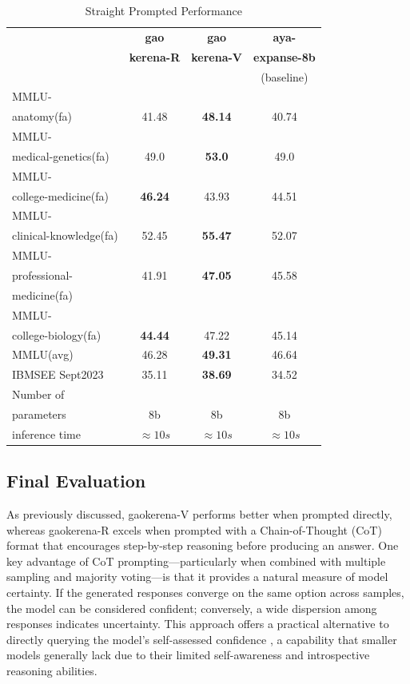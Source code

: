 \documentclass[conference]{IEEEtran}
\begin{document}
	\begin{table}[ht]
		\centering
		\caption{Straight Prompted Performance}
		\begin{tabular}{|l|c|c|c|}  
			\hline
			\textbf{} & \textbf{gao} & \textbf{gao} & \textbf{aya-} \\ 
			& \textbf{kerena-R} &  \textbf{kerena-V} & \textbf{expanse-8b} \\
			&   & &(baseline)  \\ \hline
			MMLU- &  &  &  \\ 
			anatomy(fa)  & 41.48 & \textbf{48.14}  & 40.74  \\ \hline
			MMLU- &    &   &   \\
			medical-genetics(fa) & 49.0  & \textbf{53.0}  &  49.0 \\ \hline
			MMLU- &  &    &  \\
			college-medicine(fa) & \textbf{46.24} & 43.93  & 44.51   \\ \hline
			MMLU- &    &  &  \\
			clinical-knowledge(fa) & 52.45 & \textbf{55.47}  & 52.07  \\ \hline
			MMLU- &  &  &  \\
			professional-& 41.91  & \textbf{47.05}  & 45.58   \\
                        medicine(fa)& &   &   \\ \hline
			MMLU- &  &  &  \\
			college-biology(fa)& \textbf{44.44} & 47.22  &  45.14 \\ \hline
			MMLU(avg) & 46.28 & \textbf{49.31}  & 46.64 \\ \hline
			IBMSEE Sept2023 & 35.11  &\textbf{38.69} & 34.52  \\ \hline
			Number of&  &  &  \\
			parameters & 8b & 8b & 8b \\ \hline
			inference time & $\approx10s$ & $\approx 10s$ & $\approx 10s$ \\  \hline
		\end{tabular}
		\label{tab:med_knowledge_comparison}
	\end{table}


           \subsection{Final Evaluation}
As previously discussed, gaokerena-V performs better when prompted directly, whereas gaokerena-R excels when prompted with a Chain-of-Thought (CoT) format that encourages step-by-step reasoning before producing an answer. One key advantage of CoT prompting—particularly when combined with multiple sampling and majority voting—is that it provides a natural measure of model certainty. If the generated responses converge on the same option across samples, the model can be considered confident; conversely, a wide dispersion among responses indicates uncertainty. This approach offers a practical alternative to directly querying the model’s self-assessed confidence
\cite{b26}
, a capability that smaller models generally lack due to their limited self-awareness and introspective reasoning abilities.
\end{document}
